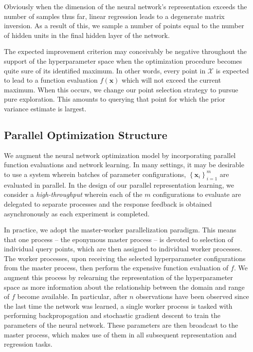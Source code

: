 \documentclass[]{article}
\newcommand{\paren}[1]{\left({#1}\right)}
\newcommand{\set}[1]{\left\{{#1}\right\}}
\newcommand{\1}{\mathbf{1}}
\newcommand{\0}{\mathbf{0}}
\newcommand{\X}{\mathcal{X}}
\newcommand{\x}{\mathbf{x}}
\begin{document}
Obviously when the dimension of the neural network's representation exceeds the number of samples thus far, linear regression leads to a degenerate matrix inversion. As a result of this, we sample a number of points equal to the number of hidden units in the final hidden layer of the network. 

The expected improvement criterion may conceivably be negative throughout the support of the hyperparameter space when the optimization procedure becomes quite sure of its identified maximum. In other words, every point in $\X$ is expected to lead to a function evaluation $f\paren{\x}$ which will not exceed the current maximum. When this occurs, we change our point selection strategy to pursue pure exploration. This amounts to querying that point for which the prior variance estimate is largest. 

\subsection{Parallel Optimization Structure}

We augment the neural network optimization model by incorporating parallel function evaluations and network learning. In many settings, it may be desirable to use a system wherein batches of parameter configurations, $\set{\x_i}_{i=1}^m$ are evaluated in parallel. In the design of our parallel representation learning, we consider a \textit{high-throughput} wherein each of the $m$ configurations to evaluate are delegated to separate processes and the response feedback is obtained asynchronously as each experiment is completed.

In practice, we adopt the master-worker parallelization paradigm. This means that one process -- the eponymous master process -- is devoted to selection of individual query points, which are then assigned to individual worker processes. The worker processes, upon receiving the selected hyperparameter configurations from the master process, then perform the expensive function evaluation of $f$. We augment this process by relearning the representation of the hyperparameter space as more information about the relationship between the domain and range of $f$ become available. In particular, after $n$ observations  have been observed since the last time the network was learned, a single worker process is tasked with performing backpropogation and stochastic gradient descent to train the parameters of the neural network. These parameters are then broadcast to the master process, which makes use of them in all subsequent representation and regression tasks.
\end{document}
